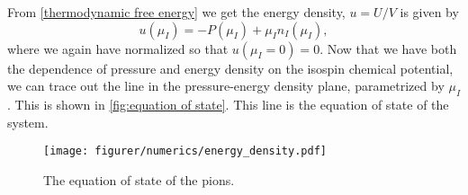 From \cref{thermodynamic free energy} we get the energy density, $u = U/V$ is given by
\begin{equation}
    u(\mu_I) = -P(\mu_I) + \mu_I n_I(\mu_I),
\end{equation}
where we again have normalized so that $u(\mu_I = 0) = 0$.
Now that we have both the dependence of pressure and energy density on the isospin chemical potential, we can trace out the line in the pressure-energy density plane, parametrized by $\mu_I$.
This is shown in \autoref{fig:equation of state}.
This line is the equation of state of the system.

\begin{figure}[!h]
    \centering
    \vspace{-0.2cm}
    \texttt{[image: figurer/numerics/energy\_density.pdf]}
    \caption{The equation of state of the pions.}
    \label{fig:equation of state}
\end{figure}

\FloatBarrier


